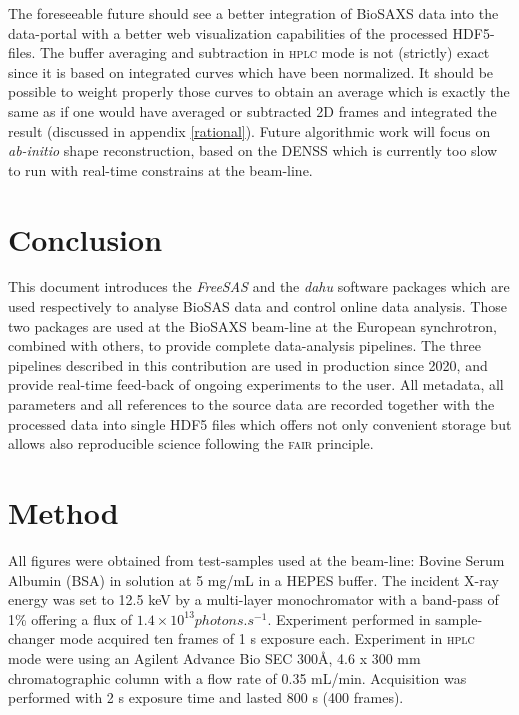 \documentclass[preprint]{iucr}              %
\begin{document}
The foreseeable future should see a better integration of BioSAXS data into the data-portal with a better web visualization capabilities of the processed HDF5-files. 
The buffer averaging and subtraction in \textsc{hplc} mode is not (strictly) exact since it is based on integrated curves which have been normalized.
It should be possible to weight properly those curves to obtain an average which is exactly the same as if one would have averaged or subtracted 2D frames and integrated the result (discussed in appendix \ref{rational}).
Future algorithmic work will focus on \textit{ab-initio} shape reconstruction, based on the DENSS \cite{denss} which is currently too slow to run with real-time constrains at the beam-line.

\section{Conclusion}

This document introduces the \textit{FreeSAS} and the \textit{dahu} software packages which are used respectively to analyse BioSAS data and control online data analysis.
Those two packages are used at the BioSAXS beam-line at the European synchrotron, combined with others, to provide complete data-analysis pipelines.
The three pipelines described in this contribution are used in production since 2020, and provide real-time feed-back of ongoing experiments to the user.
All metadata, all parameters and all references to the source data are recorded together with the processed data into single HDF5 files which offers 
not only convenient storage but allows also reproducible science following the \textsc{fair} principle. 

\appendix
\section{Method}

All figures were obtained from test-samples used at the beam-line: Bovine Serum Albumin (BSA) in solution at 5 mg/mL in a HEPES buffer.
The incident X-ray energy was set to 12.5 keV by a multi-layer monochromator with a band-pass of 1\% offering a flux of $1.4\times 10^{13} photons.s^{-1}$.
Experiment performed in sample-changer mode acquired ten frames of 1 s exposure each.
Experiment in \textsc{hplc} mode were using an Agilent Advance Bio SEC 300Å, 4.6 x 300 mm chromatographic column with a flow rate of 0.35 mL/min.
Acquisition was performed with 2 s exposure time and lasted 800 s (400 frames). 
\end{document}
